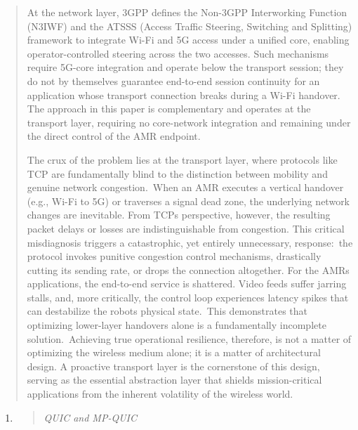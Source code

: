 \begin{quote}
At the network layer, 3GPP defines the Non-3GPP Interworking Function (N3IWF) and the ATSSS (Access Traffic Steering, Switching and Splitting) framework to integrate Wi-Fi and 5G access under a unified core, enabling operator-controlled steering across the two accesses. Such mechanisms require 5G-core integration and operate below the transport session; they do not by themselves guarantee end-to-end session continuity for an application whose transport connection breaks during a Wi-Fi handover. The approach in this paper is complementary and operates at the transport layer, requiring no core-network integration and remaining under the direct control of the AMR endpoint.

The crux of the problem lies at the transport layer, where protocols like TCP are fundamentally blind to the distinction between mobility and genuine network congestion.~When an AMR executes a vertical handover (e.g., Wi-Fi to 5G) or traverses a signal dead zone, the underlying network changes are inevitable. From TCP\textquotesingle s perspective, however, the resulting packet delays or losses are indistinguishable from congestion. This critical misdiagnosis triggers a catastrophic, yet entirely unnecessary, response:~the protocol invokes punitive congestion control mechanisms, drastically cutting its sending rate, or drops the connection altogether. For the AMR\textquotesingle s applications, the end-to-end service is shattered. Video feeds suffer jarring stalls, and, more critically, the control loop experiences latency spikes that can destabilize the robot\textquotesingle s physical state.~This demonstrates that optimizing lower-layer handovers alone is a fundamentally incomplete solution.~Achieving true operational resilience, therefore, is not a matter of optimizing the wireless medium alone; it is a matter of architectural design. A proactive transport layer is the cornerstone of this design, serving as the essential abstraction layer that shields mission-critical applications from the inherent volatility of the wireless world.
\end{quote}

\begin{enumerate}
\def\labelenumi{\arabic{enumi}.}
\setcounter{enumi}{1}
\item
  \begin{quote}
  \emph{QUIC and MP-QUIC}
  \end{quote}
\end{enumerate}

